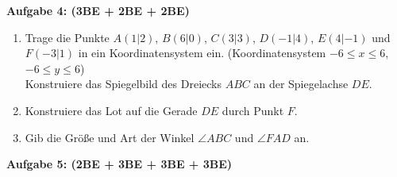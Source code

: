 \documentclass[a4paper,12pt]{article}
\newcommand{\Aufgabe}[1]{
  {
  \vspace*{0.5cm}
  \textsf{\textbf{Aufgabe #1}}
  \vspace*{0.2cm}
  
  }
}
\begin{document}
\newpage
\vspace*{-2cm}
\Aufgabe{4: (3BE + 2BE + 2BE)}
\begin{enumerate}[label={\alph*)}]
  \item Trage die Punkte $A(1|2)$, $B(6|0)$, $C(3|3)$, $D(-1|4)$, $E(4|-1)$ und $F(-3|1)$ in ein Koordinatensystem ein. (Koordinatensystem $-6\le x \le 6$, $-6\le y \le 6$)\\ 
    Konstruiere das Spiegelbild des Dreiecks $ABC$ an der Spiegelachse $DE$. 
  \item Konstruiere das Lot auf die Gerade $DE$ durch Punkt $F$.
\vspace{190mm}
  \item Gib die Größe und Art der Winkel $\angle ABC$ und $\angle FAD$ an.
\vspace{50mm}
\end{enumerate}

\newpage
\vspace*{-2cm}

\Aufgabe{5: (2BE + 3BE + 3BE + 3BE)}
\end{document}
